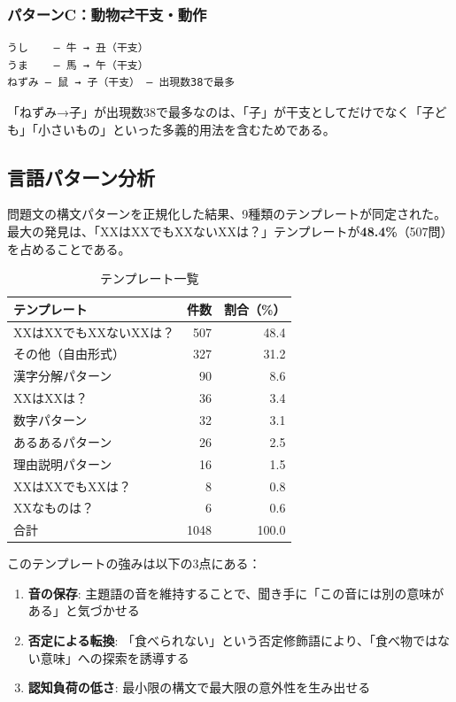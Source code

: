 \documentclass[a4paper,11pt]{ltjsarticle}
\begin{document}
\subsubsection*{パターンC：動物⇄干支・動作}

\begin{Verbatim}[frame=single,fontsize=\small]
うし    — 牛 → 丑（干支）
うま    — 馬 → 午（干支）
ねずみ — 鼠 → 子（干支） — 出現数38で最多
\end{Verbatim}

「ねずみ→子」が出現数38で最多なのは、「子」が干支としてだけでなく「子ども」「小さいもの」といった多義的用法を含むためである。

\subsection{言語パターン分析}

問題文の構文パターンを正規化した結果、9種類のテンプレートが同定された。最大の発見は、「XXはXXでもXXないXXは？」テンプレートが\textbf{48.4\%}（507問）を占めることである。

\begin{table}[htbp]
\caption{テンプレート一覧}
\centering
\begin{tabular}{lrr}
\toprule
テンプレート & 件数 & 割合（\%）\\
\midrule
XXはXXでもXXないXXは？ & 507 & 48.4\\
その他（自由形式） & 327 & 31.2\\
漢字分解パターン & 90 & 8.6\\
XXはXXは？ & 36 & 3.4\\
数字パターン & 32 & 3.1\\
あるあるパターン & 26 & 2.5\\
理由説明パターン & 16 & 1.5\\
XXはXXでもXXは？ & 8 & 0.8\\
XXなものは？ & 6 & 0.6\\
\midrule
合計 & 1048 & 100.0\\
\bottomrule
\end{tabular}
\end{table}

このテンプレートの強みは以下の3点にある：

\begin{enumerate}
    \item \textbf{音の保存}: 主題語の音を維持することで、聞き手に「この音には別の意味がある」と気づかせる
    \item \textbf{否定による転換}: 「食べられない」という否定修飾語により、「食べ物ではない意味」への探索を誘導する
    \item \textbf{認知負荷の低さ}: 最小限の構文で最大限の意外性を生み出せる
\end{enumerate}
\end{document}
